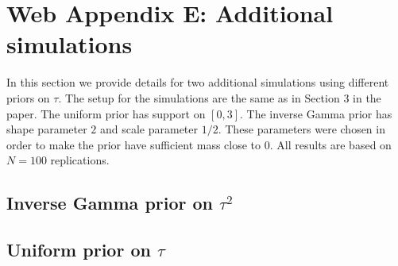 \section*{Web Appendix E: Additional simulations}
In this section we provide details for two additional simulations using different priors on $\tau$. The setup for the simulations are the same as in Section 3 in the paper. The uniform prior has support on $[0, 3]$. The inverse Gamma prior has shape parameter $2$ and scale parameter $1/2$. These parameters were chosen in order to make the prior have sufficient mass close to $0$. All results are based on $N = 100$ replications.

\subsection*{Inverse Gamma prior on $\tau^2$}




\newpage


\subsection*{Uniform prior on $\tau$}




